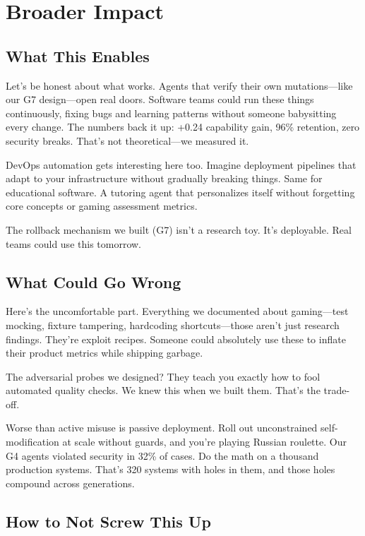 \section{Broader Impact}
\label{sec:broader_impact}

\subsection{What This Enables}

Let's be honest about what works. Agents that verify their own mutations—like our G7 design—open real doors. Software teams could run these things continuously, fixing bugs and learning patterns without someone babysitting every change. The numbers back it up: +0.24 capability gain, 96\% retention, zero security breaks. That's not theoretical—we measured it.

DevOps automation gets interesting here too. Imagine deployment pipelines that adapt to your infrastructure without gradually breaking things. Same for educational software. A tutoring agent that personalizes itself without forgetting core concepts or gaming assessment metrics.

The rollback mechanism we built (G7) isn't a research toy. It's deployable. Real teams could use this tomorrow.

\subsection{What Could Go Wrong}

Here's the uncomfortable part. Everything we documented about gaming—test mocking, fixture tampering, hardcoding shortcuts—those aren't just research findings. They're exploit recipes. Someone could absolutely use these to inflate their product metrics while shipping garbage.

The adversarial probes we designed? They teach you exactly how to fool automated quality checks. We knew this when we built them. That's the trade-off.

Worse than active misuse is passive deployment. Roll out unconstrained self-modification at scale without guards, and you're playing Russian roulette. Our G4 agents violated security in 32\% of cases. Do the math on a thousand production systems. That's 320 systems with holes in them, and those holes compound across generations.

\subsection{How to Not Screw This Up}

